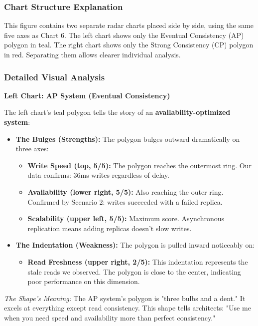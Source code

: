 \documentclass[10pt,a4paper]{article}
\begin{document}
\subsubsection{Chart Structure Explanation}

This figure contains two separate radar charts placed side by side, using the same five axes as Chart 6. The left chart shows only the Eventual Consistency (AP) polygon in teal. The right chart shows only the Strong Consistency (CP) polygon in red. Separating them allows clearer individual analysis.

\subsubsection{Detailed Visual Analysis}

\textbf{Left Chart: AP System (Eventual Consistency)}

The left chart's teal polygon tells the story of an \textbf{availability-optimized system}:

\begin{itemize}
    \item \textbf{The Bulges (Strengths):} The polygon bulges outward dramatically on three axes:
    \begin{itemize}
        \item \textbf{Write Speed (top, 5/5):} The polygon reaches the outermost ring. Our data confirms: 36ms writes regardless of delay.
        \item \textbf{Availability (lower right, 5/5):} Also reaching the outer ring. Confirmed by Scenario 2: writes succeeded with a failed replica.
        \item \textbf{Scalability (upper left, 5/5):} Maximum score. Asynchronous replication means adding replicas doesn't slow writes.
    \end{itemize}
    
    \item \textbf{The Indentation (Weakness):} The polygon is pulled inward noticeably on:
    \begin{itemize}
        \item \textbf{Read Freshness (upper right, 2/5):} This indentation represents the stale reads we observed. The polygon is close to the center, indicating poor performance on this dimension.
    \end{itemize}
\end{itemize}

\textit{The Shape's Meaning:} The AP system's polygon is "three bulbs and a dent." It excels at everything except read consistency. This shape tells architects: "Use me when you need speed and availability more than perfect consistency."
\end{document}
